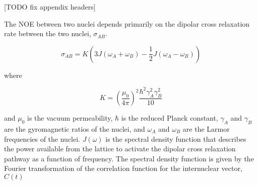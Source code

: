 \documentclass[9pt,review]{livecoms}
\newcommand{\githubrepository}{\url{https://github.com/openforcefield/review-protein-benchmark-datasets}}  %
\begin{document}









[TODO fix appendix headers]

\label{app:noesy_distances}

The NOE between two nuclei depends primarily on the dipolar cross relaxation rate between the two nuclei, $\sigma_{AB}$.

\begin{equation}
\label{eqn:noe_cross_relaxation}
\sigma_{AB} = K \left( 3 J(\omega_A + \omega_B) - \frac {1} {2} J(\omega_A - \omega_B) \right)
\end{equation}

\noindent where

\begin{equation}
\label{eqn:noe_constant}
K = \left( \frac {\mu_0} {4 \pi} \right)^2 \frac {\hbar^2 \gamma_A^2 \gamma_B^2} {10}
\end{equation}

\noindent and $\mu_0$ is the vacuum permeability, $\hbar$ is the reduced Planck constant, $\gamma_A$ and $\gamma_B$ are the gyromagnetic ratios of the nuclei, and $\omega_A$ and $\omega_B$ are the Larmor frequencies of the nuclei.
$J(\omega)$ is the spectral density function that describes the power available from the lattice to activate the dipolar cross relaxation pathway as a function of frequency.
The spectral density function is given by the Fourier transformation of the correlation function for the internuclear vector, $C(t)$
\end{document}
